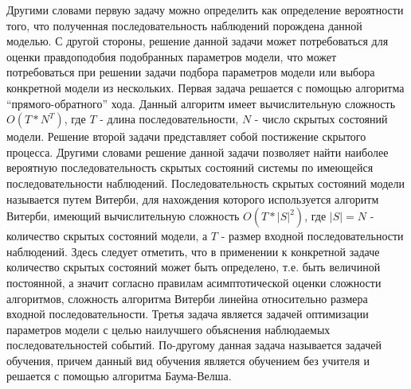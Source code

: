 Другими словами первую задачу можно определить как определение вероятности того, что полученная последовательность наблюдений порождена данной моделью. С другой стороны, решение данной задачи может потребоваться для оценки правдоподобия подобранных параметров модели, что может потребоваться при решении задачи подбора параметров модели или выбора конкретной модели из нескольких. Первая задача решается с помощью алгоритма ``прямого-обратного'' хода. Данный алгоритм имеет вычислительную сложность \(O(T * N^T)\), где \(T\) - длина последовательности, \(N\) - число скрытых состояний модели. Решение второй задачи представляет собой постижение скрытого процесса. Другими словами решение данной задачи позволяет найти наиболее вероятную последовательность скрытых состояний системы по имеющейся последовательности наблюдений. Последовательность скрытых состояний модели называется путем Витерби, для нахождения которого используется алгоритм Витерби, имеющий вычислительную сложность \(O(T * |S|^2)\), где \(|S| = N\) - количество скрытых состояний модели, а \(T\) - размер входной последовательности наблюдений. Здесь следует отметить, что в применении к конкретной задаче количество скрытых состояний может быть определено, т.е. быть величиной постоянной, а значит согласно правилам асимптотической оценки \cite{clrs} сложности алгоритмов, сложность алгоритма Витерби линейна относительно размера входной последовательности. Третья задача является задачей оптимизации параметров модели с целью наилучшего объяснения наблюдаемых последовательностей событий. По-другому данная задача называется задачей обучения, причем данный вид обучения является обучением без учителя и решается с помощью алгоритма Баума-Велша.

